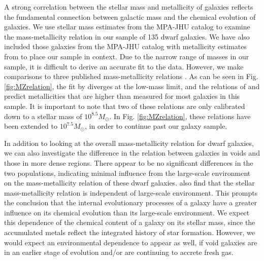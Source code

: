 A strong correlation between the stellar mass and metallicity of galaxies 
reflects the fundamental connection between galactic mass and the chemical 
evolution of galaxies.  We use stellar mass estimates from the MPA-JHU catalog 
to examine the mass-metallicity relation in our sample of 135 dwarf galaxies.  
We have also included those galaxies from the MPA-JHU catalog with metallicity 
estimates from \cite{Tremonti04} to place our sample in context.  Due to the 
narrow range of masses in our sample, it is difficult to derive an accurate fit 
to the data.  However, we make comparisons to three published mass-metallicity 
relations \citep{Tremonti04, Mannucci10, Andrews13}.  As can be seen in Fig. 
\ref{fig:MZrelation}, the fit by \cite{Mannucci10} diverges at the low-mass 
limit, and the relations of \cite{Tremonti04} and \cite{Andrews13} predict 
metallicities that are higher than measured for most galaxies in this sample.  
It is important to note that two of these relations are only calibrated down to 
a stellar mass of $10^{8.5} M_{\odot}$.  In Fig. \ref{fig:MZrelation}, these 
relations have been extended to $10^{7.5} M_{\odot}$, in order to continue past 
our galaxy sample.

In addition to looking at the overall mass-metallicity relation for dwarf 
galaxies, we can also investigate the difference in the relation between 
galaxies in voids and those in more dense regions.  There appear to be no 
significant differences in the two populations, indicating minimal influence 
from the large-scale environment on the mass-metallicity relation of these dwarf 
galaxies.  \cite{Hughes13} also find that the stellar mass-metallicity relation 
is independent of large-scale environment.  This prompts the conclusion that the 
internal evolutionary processes of a galaxy have a greater influence on its 
chemical evolution than its large-scale environment.  We expect this dependence 
of the chemical content of a galaxy on its stellar mass, since the accumulated 
metals reflect the integrated history of star formation.  However, we would 
expect an environmental dependence to appear as well, if void galaxies are in an 
earlier stage of evolution and/or are continuing to accrete fresh gas.

